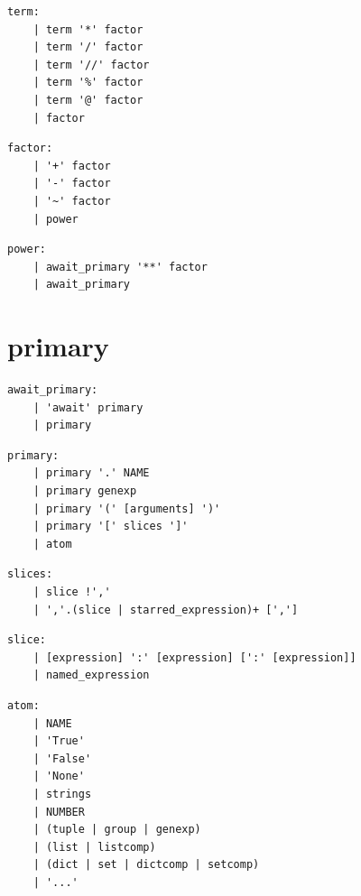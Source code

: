 \noindent\textbf{\texttt{}}\par
\begin{lstlisting}
term:
    | term '*' factor
    | term '/' factor
    | term '//' factor
    | term '%' factor
    | term '@' factor
    | factor
\end{lstlisting}

\noindent\textbf{\texttt{}}\par
\begin{lstlisting}
factor:
    | '+' factor
    | '-' factor
    | '~' factor
    | power
\end{lstlisting}

\noindent\textbf{\texttt{}}\par
\begin{lstlisting}
power:
    | await_primary '**' factor
    | await_primary
\end{lstlisting}

\section{primary}

\noindent\textbf{\texttt{}}\par
\begin{lstlisting}
await_primary:
    | 'await' primary
    | primary
\end{lstlisting}

\noindent\textbf{\texttt{}}\par
\begin{lstlisting}
primary:
    | primary '.' NAME
    | primary genexp
    | primary '(' [arguments] ')'
    | primary '[' slices ']'
    | atom
\end{lstlisting}

\noindent\textbf{\texttt{}}\par
\begin{lstlisting}
slices:
    | slice !','
    | ','.(slice | starred_expression)+ [',']
\end{lstlisting}

\noindent\textbf{\texttt{}}\par
\begin{lstlisting}
slice:
    | [expression] ':' [expression] [':' [expression]]
    | named_expression
\end{lstlisting}

\noindent\textbf{\texttt{}}\par
\begin{lstlisting}
atom:
    | NAME
    | 'True'
    | 'False'
    | 'None'
    | strings
    | NUMBER
    | (tuple | group | genexp)
    | (list | listcomp)
    | (dict | set | dictcomp | setcomp)
    | '...'
\end{lstlisting}

